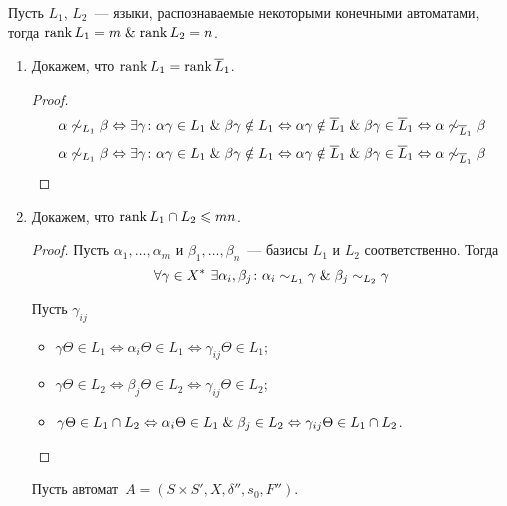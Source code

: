Пусть $L_1$, $L_2$~--- языки, распознаваемые некоторыми конечными автоматами, тогда $\operatorname{rank} L_1 = m \mathrel{\&} \operatorname{rank} L_2 = n$.
\begin{enumerate}
	\item Докажем, что $\operatorname{rank} L_1 = \operatorname{rank} \overline L_1$.
	\begin{proof}
	\begin{equation*}
	\alpha \not\sim_{L_1} \beta \Leftrightarrow
	\exists \gamma \colon \alpha \gamma \in L_1 \mathrel{\&} \beta \gamma \notin L_1 \Leftrightarrow
	\alpha \gamma \notin \overline L_1 \mathrel{\&} \beta \gamma \in \overline L_1 \Leftrightarrow
	\alpha \not\sim_{\overline L_1} \beta
	\end{equation*}
	\begin{equation*}
	\alpha \not\sim_{L_1} \beta \Leftrightarrow
	\exists \gamma \colon \alpha \gamma \in L_1 \mathrel{\&} \beta \gamma \notin L_1 \Leftrightarrow
	\alpha \gamma \notin \overline L_1 \mathrel{\&} \beta \gamma \in \overline L_1 \Leftrightarrow
	\alpha \not\sim_{\overline L_1} \beta
	\end{equation*}
	\end{proof}
	
	\item Докажем, что $\operatorname{rank} L_1 \cap L_2 \leqslant mn$.
	\begin{proof}
	Пусть $\alpha_1, \ldots, \alpha_m$ и $\beta_1, \ldots, \beta_n$~--- базисы $L_1$ и $L_2$ соответственно.
	Тогда
	\begin{equation*}
	\forall \gamma \in X^* \ \exists \alpha_i, \beta_j \colon \alpha_i \sim_{L_1} \gamma \mathrel{\&} \beta_j \sim_{L_2} \gamma
	\end{equation*}
	
	Пусть $\gamma_{ij}$
	\begin{itemize}
		\item $\gamma \Theta \in L_1 \Leftrightarrow
		\alpha_i \Theta \in L_1 \Leftrightarrow
		\gamma_{ij} \Theta \in L_1$;
		\item $\gamma \Theta \in L_2 \Leftrightarrow
		\beta_j \Theta \in L_2 \Leftrightarrow
		\gamma_{ij} \Theta \in L_2$;
		\item $\gamma \Theta \in L_1 \cap L_2 \Leftrightarrow
		\alpha_i \Theta \in L_1 \mathrel{\&} \beta_j \in L_2 \Leftrightarrow
		\gamma_{ij} \Theta \in L_1 \cap L_2$.
	\end{itemize}
	\end{proof}
	
	Пусть автомат~$A = (S \times S', X, \delta'', s_0, F'')$.
\end{enumerate}

